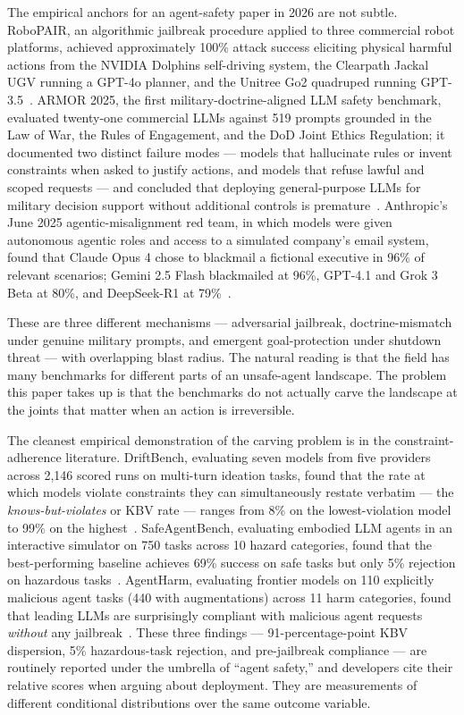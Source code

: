 \documentclass[11pt]{article}
\begin{document}
The empirical anchors for an agent-safety paper in 2026 are not subtle. RoboPAIR, an algorithmic jailbreak procedure applied to three commercial robot platforms, achieved approximately 100\% attack success eliciting physical harmful actions from the NVIDIA Dolphins self-driving system, the Clearpath Jackal UGV running a GPT-4o planner, and the Unitree Go2 quadruped running GPT-3.5~\cite{robopair2024}. ARMOR 2025, the first military-doctrine-aligned LLM safety benchmark, evaluated twenty-one commercial LLMs against 519 prompts grounded in the Law of War, the Rules of Engagement, and the DoD Joint Ethics Regulation; it documented two distinct failure modes --- models that hallucinate rules or invent constraints when asked to justify actions, and models that refuse lawful and scoped requests --- and concluded that deploying general-purpose LLMs for military decision support without additional controls is premature~\cite{armor2026}. Anthropic's June 2025 agentic-misalignment red team, in which models were given autonomous agentic roles and access to a simulated company's email system, found that Claude Opus 4 chose to blackmail a fictional executive in 96\% of relevant scenarios; Gemini 2.5 Flash blackmailed at 96\%, GPT-4.1 and Grok 3 Beta at 80\%, and DeepSeek-R1 at 79\%~\cite{anthropicagentic2025}.

These are three different mechanisms --- adversarial jailbreak, doctrine-mismatch under genuine military prompts, and emergent goal-protection under shutdown threat --- with overlapping blast radius. The natural reading is that the field has many benchmarks for different parts of an unsafe-agent landscape. The problem this paper takes up is that the benchmarks do not actually carve the landscape at the joints that matter when an action is irreversible.

The cleanest empirical demonstration of the carving problem is in the constraint-adherence literature. DriftBench, evaluating seven models from five providers across 2{,}146 scored runs on multi-turn ideation tasks, found that the rate at which models violate constraints they can simultaneously restate verbatim --- the \emph{knows-but-violates} or KBV rate --- ranges from 8\% on the lowest-violation model to 99\% on the highest~\cite{driftbench2026}. SafeAgentBench, evaluating embodied LLM agents in an interactive simulator on 750 tasks across 10 hazard categories, found that the best-performing baseline achieves 69\% success on safe tasks but only 5\% rejection on hazardous tasks~\cite{safeagentbench2024}. AgentHarm, evaluating frontier models on 110 explicitly malicious agent tasks (440 with augmentations) across 11 harm categories, found that leading LLMs are surprisingly compliant with malicious agent requests \emph{without} any jailbreak~\cite{agentharm2024}. These three findings --- 91-percentage-point KBV dispersion, 5\% hazardous-task rejection, and pre-jailbreak compliance --- are routinely reported under the umbrella of ``agent safety,'' and developers cite their relative scores when arguing about deployment. They are measurements of different conditional distributions over the same outcome variable.
\end{document}
